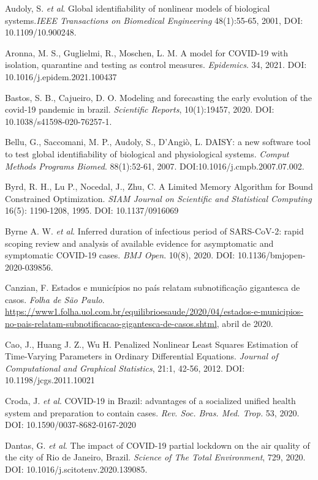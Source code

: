 Audoly, S. {\it et al}. Global identifiability of nonlinear models of biological
systems.{\it IEEE Transactions on Biomedical Engineering} 48(1):55-65, 2001, DOI: 10.1109/10.900248.

Aronna, M. S., Guglielmi, R., Moschen, L. M. A model for COVID-19 with
isolation, quarantine and testing as control measures. {\it Epidemics}. 34,
2021. DOI: 10.1016/j.epidem.2021.100437

Bastos, S. B., Cajueiro, D. O. Modeling and forecasting the early evolution of
the covid-19 pandemic in brazil. {\it Scientific Reports}, 10(1):19457, 2020.
DOI: 10.1038/s41598-020-76257-1.

Bellu, G., Saccomani, M. P., Audoly, S., D'Angiò, L. DAISY: a new software
tool to test global identifiability of biological and physiological systems.
{\it Comput Methods Programs Biomed}. 88(1):52-61, 2007.
DOI:10.1016/j.cmpb.2007.07.002.

Byrd, R. H., Lu P., Nocedal, J., Zhu, C. A Limited Memory Algorithm for Bound
Constrained Optimization. {\it SIAM Journal on Scientific and Statistical
Computing} 16(5): 1190-1208, 1995. DOI: 10.1137/0916069

Byrne A. W. {\it et al}. Inferred duration of infectious period of SARS-CoV-2:
rapid scoping review and analysis of available evidence for asymptomatic and
symptomatic COVID-19 cases. {\it BMJ Open}. 10(8), 2020. DOI: 10.1136/bmjopen-2020-039856.

Canzian, F. Estados e municípios no país relatam subnotificação gigantesca de casos. {\it Folha de São Paulo}. \url{https://www1.folha.uol.com.br/equilibrioesaude/2020/04/estados-e-municipios-no-pais-relatam-subnotificacao-gigantesca-de-casos.shtml}, abril de 2020. 

Cao, J., Huang J. Z., Wu H. Penalized Nonlinear Least Squares Estimation of Time-Varying Parameters in Ordinary Differential Equations. 
{\it Journal of Computational and Graphical Statistics}, 21:1, 42-56, 2012.
DOI: 10.1198/jcgs.2011.10021

Croda, J. {\it et al}. COVID-19 in Brazil: advantages of a socialized unified health
system and preparation to contain cases. {\it Rev. Soc. Bras. Med. Trop.} 53,
2020. DOI: 10.1590/0037-8682-0167-2020

Dantas, G. {\it et al}. The impact of COVID-19 partial lockdown on the air quality
of the city of Rio de Janeiro, Brazil. {\it Science of The Total Environment},
729, 2020. DOI: 10.1016/j.scitotenv.2020.139085.

